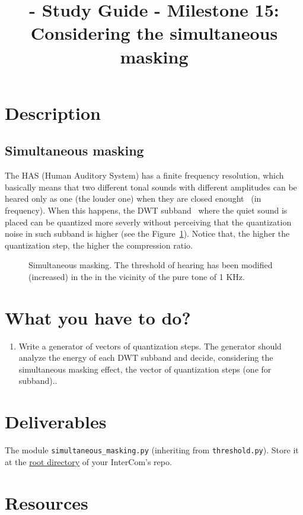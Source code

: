 
\title{\TM{} - Study Guide - Milestone 15: Considering the simultaneous masking}

\maketitle

\section{Description}

\subsection{Simultaneous masking}
The HAS (Human Auditory System) has a finite frequency resolution,
which basically means that two different tonal sounds with different
amplitudes can be heared only as one (the louder one) when they are
closed enought~\cite{bosi2003intro} (in frequency). When this happens, the DWT
subband~\cite{vetterli1995wavelets} where the quiet sound is placed
can be quantized more severly without perceiving that the quantization
noise in such subband is higher (see the Figure~\ref{fig:SM}). Notice
that, the higher the quantization step, the higher the compression
ratio.

\begin{figure}
  \centering
  \caption{Simultaneous masking. The threshold of hearing has been modified (increased) in the in the vicinity of the pure tone of 1 KHz.}
  \label{fig:SM}
\end{figure}

\section{What you have to do?}

\begin{enumerate}
\item Write a generator of vectors of quantization steps. The
  generator should analyze the energy of each DWT subband and decide,
  considering the simultaneous masking effect, the vector of
  quantization steps (one for subband)..
\end{enumerate}

\section{Deliverables}

The module \verb|simultaneous_masking.py| (inheriting from
\verb|threshold.py|). Store it at the
\href{https://github.com/Tecnologias-multimedia/intercom}{root
  directory} of your InterCom's repo.

\section{Resources}



